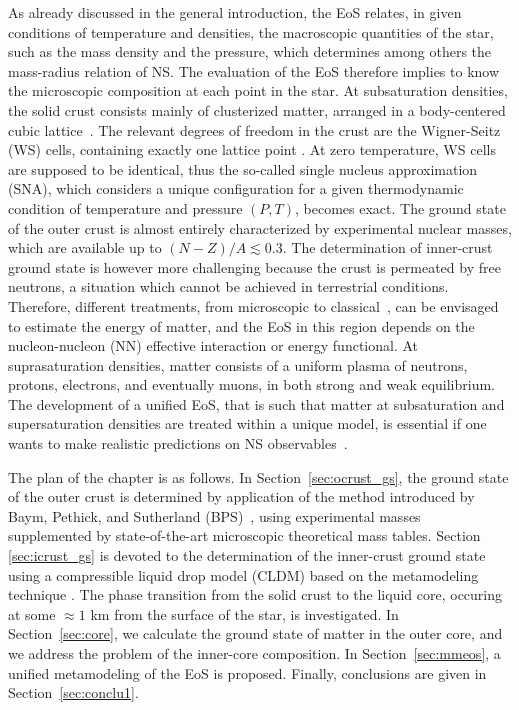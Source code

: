 As already discussed in the general introduction, the EoS 
relates, in given conditions of temperature and densities, the macroscopic
quantities of the star, such as the mass density and the pressure, which
determines among others the mass-radius relation of NS. The evaluation of the
EoS therefore implies to know the microscopic composition at each point in the
star. At subsaturation densities, the solid crust consists mainly of 
clusterized matter, arranged in a body-centered cubic lattice~\cite{Haensel2007}. 
The relevant degrees of freedom in the crust are the Wigner-Seitz (WS) 
cells, containing exactly one lattice point \cite{Wigner1933}. At zero
temperature, WS cells are supposed to be identical, thus the so-called single
nucleus approximation (SNA), which considers a unique configuration for a given 
thermodynamic condition of temperature and pressure $(P,T)$, becomes exact. The 
ground state of the outer crust is almost entirely characterized by experimental 
nuclear masses, which are available up to $(N-Z)/A \lesssim 0.3$. The 
determination of inner-crust ground state is however more challenging because 
the crust is permeated by free neutrons, a situation which cannot be achieved
in terrestrial conditions. Therefore, different treatments, from 
microscopic \cite{Negele1973} to classical~\cite{BBP}, can be envisaged to
estimate the energy of matter, and the EoS in this region depends on the 
nucleon-nucleon (NN) effective interaction or energy functional. At 
suprasaturation densities, matter consists of a uniform plasma of neutrons, 
protons, electrons, and eventually muons, in both strong and weak equilibrium. 
The development of a unified EoS, that is such that 
matter at subsaturation and supersaturation densities are treated within a
unique model, is essential if one wants to make realistic predictions on NS
observables~\cite{Fortin2016}.

The plan of the chapter is as follows. In Section~\ref{sec:ocrust_gs}, the 
ground state of the outer crust is determined by application of the 
method introduced by Baym, Pethick, and Sutherland (BPS)~\cite{BPS}, using 
experimental masses~\cite{Huang2017} supplemented by 
state-of-the-art microscopic theoretical mass tables. 
Section \ref{sec:icrust_gs} is devoted to the determination of the inner-crust ground 
state using a compressible liquid drop model (CLDM) based on the metamodeling
technique \cite{Margueron2018a,Carreau2019cc}. The phase transition 
from the solid crust to the liquid core, occuring at some $\approx 1$ km from the 
surface of the star, is investigated. In Section~\ref{sec:core}, we calculate 
the ground state of matter in the outer core, and we address the problem of the 
inner-core composition. In Section~\ref{sec:mmeos}, a unified metamodeling of 
the EoS is proposed. Finally, conclusions are given in Section~\ref{sec:conclu1}.

